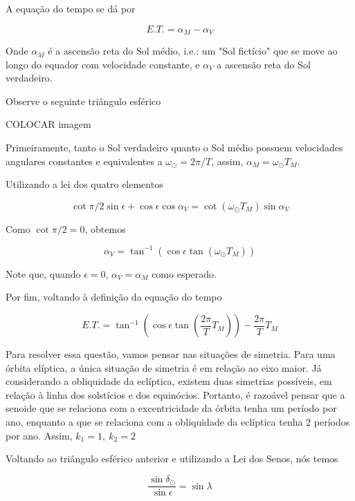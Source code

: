 \documentclass[11pt]{article}
\begin{document}
\begin{pproblem}
\begin{pssolution*}{}{ }
    \begin{alternativas}
        \item A equação do tempo se dá por
        
        \[E.T. = \alpha_M - \alpha_V\]

        Onde \(\alpha_M\) é a ascensão reta do Sol médio, i.e.: um "Sol fictício" que se move ao longo do equador com velocidade constante, e \(\alpha_V\) a ascensão reta do Sol verdadeiro.

        Observe o seguinte triângulo esférico

        COLOCAR imagem

        Primeiramente, tanto o Sol verdadeiro quanto o Sol médio possuem velocidades angulares constantes e equivalentes a \(\omega_\odot = 2\pi/T\), assim, \(\alpha_M=\omega_\odot T_M\).

        Utilizando a lei dos quatro elementos

        \[\cot \pi/2 \sin\epsilon + \cos\epsilon\cos\alpha_V=\cot(\omega_\odot T_M)\sin\alpha_V\]

        Como \(\cot\pi/2 =0\), obtemos

        \[\alpha_V = \tan^{-1}(\cos\epsilon\tan(\omega_\odot T_M))\]

        Note que, quando \(\epsilon = 0\), \(\alpha_V = \alpha_M\) como esperado.

        Por fim, voltando à definição da equação do tempo

        \[\boxed{E.T. = \tan^{-1}\left(\cos\epsilon\tan\left(\frac{2\pi}{T} T_M\right)\right) - \frac{2\pi}{T}T_M}\]

        \item Para resolver essa questão, vamos pensar nas situações de simetria. Para uma órbita elíptica, a única situação de simetria é em relação ao eixo maior. Já considerando a obliquidade da eclíptica, existem duas simetrias possíveis, em relação à linha dos solstícios e dos equinócios. Portanto, é razoável pensar que a senoide que se relaciona com a excentricidade da órbita tenha um período por ano, enquanto a que se relaciona com a obliquidade da eclíptica tenha 2 períodos por ano. Assim, \(\boxed{k_1=1, \ k_2 = 2}\)
        
        \item Voltando ao triângulo esférico anterior e utilizando a Lei dos Senos, nós temos
        
        \[\frac{\sin\delta_\odot}{\sin\epsilon} = \sin\lambda\]


\end{alternativas}
\end{pssolution*}
\end{pproblem}
\end{document}
